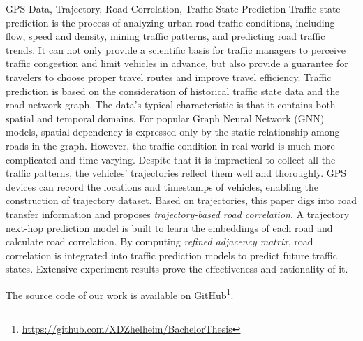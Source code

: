 \begin{英文摘要}{GPS Data, Trajectory, Road Correlation, Traffic State Prediction}
  Traffic state prediction is the process of analyzing urban road traffic conditions, including flow, speed and density, mining traffic patterns, and predicting road traffic trends. It can not only provide a scientific basis for traffic managers to perceive traffic congestion and limit vehicles in advance, but also provide a guarantee for travelers to choose proper travel routes and improve travel efficiency. Traffic prediction is based on the consideration of historical traffic state data and the road network graph. The data's typical characteristic is that it contains both spatial and temporal domains. For popular Graph Neural Network (GNN) models, spatial dependency is expressed only by the static relationship among roads in the graph. However, the traffic condition in real world is much more complicated and time-varying. Despite that it is impractical to collect all the traffic patterns, the vehicles' trajectories reflect them well and thoroughly. GPS devices can record the locations and timestamps of vehicles, enabling the construction of trajectory dataset. Based on trajectories, this paper digs into road transfer information and proposes \textit{trajectory-based road correlation}. A trajectory next-hop prediction model is built to learn the embeddings of each road and calculate road correlation. By computing \textit{refined adjacency matrix}, road correlation is integrated into traffic prediction models to predict future traffic states. Extensive experiment results prove the effectiveness and rationality of it.

  The source code of our work is available on GitHub\footnote{\href{https://github.com/XDZhelheim/BachelorThesis}{https://github.com/XDZhelheim/BachelorThesis}}.
\end{英文摘要}